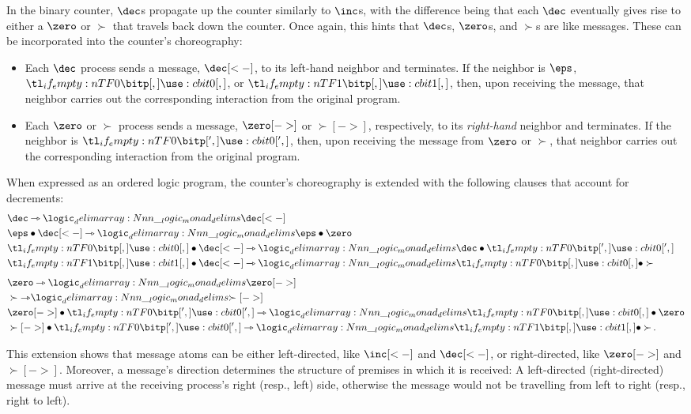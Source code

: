In the binary counter, $\dec$s propagate up the counter similarly to $\inc$s, with the difference being that each $\dec$ eventually gives rise to either a $\zero$ or $\succ$ that travels back down the counter.
Once again, this hints that $\dec$s, $\zero$s, and $\succ$s are like messages.
These can be incorporated into the counter's choreography:
\begin{itemize}
\item Each $\dec$ process sends a message, $\dec[<-]$, to its left-hand neighbor and terminates.
      If the neighbor is $\eps$, $\bit{0}$, or $\bit{1}$, then, upon receiving the message, that neighbor carries out the corresponding interaction from the original program.
\item Each $\zero$ or $\succ$ process sends a message, $\zero[->]$ or $\succ[->]$, respectively, to its \emph{right-hand} neighbor and terminates.
      If the neighbor is $\bit[']{0}$, then, upon receiving the message from $\zero$ or $\succ$, that neighbor carries out the corresponding interaction from the original program.
\end{itemize}
When expressed as an ordered logic program, the counter's choreography is extended with the following clauses that account for decrements:
\begin{align*}
  &\dec \lrimp \monad{\dec[<-]} \\
  &\eps \fuse \dec[<-] \lrimp \monad{\eps \fuse \zero} \\
  &\bit{0} \fuse \dec[<-] \lrimp \monad{\dec \fuse \bit[']{0}} \\
  &\bit{1} \fuse \dec[<-] \lrimp \monad{\bit{0} \fuse \succ} \\[1.5\jot]
  &\zero \lrimp \monad{\zero[->]} \\
  &\succ \lrimp \monad{\succ[->]} \\
  &\zero[->] \fuse \bit[']{0} \lrimp \monad{\bit{0} \fuse \zero} \\
  &\succ[->] \fuse \bit[']{0} \lrimp \monad{\bit{1} \fuse \succ}
  \,.
\end{align*}

This extension shows that message atoms can be either left-directed, like $\inc[<-]$ and $\dec[<-]$, or right-directed, like $\zero[->]$ and $\succ[->]$.
Moreover, a message's direction determines the structure of premises in which it is received:
A left-directed (right-directed) message must arrive at the receiving process's right (resp., left) side, otherwise the message would not be travelling from left to right (resp., right to left).

